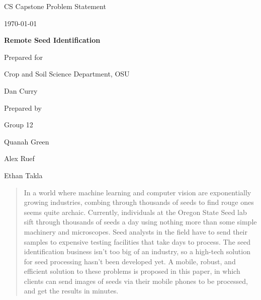 \documentclass[onecolumn, draftclsnofoot,10pt, compsoc]{IEEEtran}
\def \CapstoneTeamName{		The Cleverly Named Team}
\def \CapstoneTeamNumber{		12}
\def \GroupMemberOne{			Quanah Green}
\def \GroupMemberTwo{			Alex Ruef}
\def \GroupMemberThree{			Ethan Takla}
\def \CapstoneProjectName{		Remote Seed Identification}
\def \CapstoneSponsorCompany{	Crop and Soil Science Department, OSU}
\def \CapstoneSponsorPerson{		Dan Curry}
\def \DocType{		Problem Statement
				}
\newcommand{\NameSigPair}[1]{\par
\makebox[2.75in][r]{#1} \hfil 	\makebox[3.25in]{\makebox[2.25in]{\hrulefill} \hfill		\makebox[.75in]{\hrulefill}}
\par\vspace{-12pt} \textit{\tiny\noindent
\makebox[2.75in]{} \hfil		\makebox[3.25in]{\makebox[2.25in][r]{Signature} \hfill	\makebox[.75in][r]{Date}}}}
\renewcommand{\NameSigPair}[1]{#1}
\begin{document}
\begin{titlepage}
    \begin{singlespace}
        \hfill 
        \par\vspace{.2in}
        \centering
        \scshape{
            \huge CS Capstone \DocType \par
            {\large\today}\par
            \vspace{.5in}
            \textbf{\Huge\CapstoneProjectName}\par
            \vfill
            {\large Prepared for}\par
            \Huge \CapstoneSponsorCompany\par
            \vspace{5pt}
            {\Large\NameSigPair{\CapstoneSponsorPerson}\par}
            {\large Prepared by }\par
            Group\CapstoneTeamNumber\par
            \vspace{5pt}
            {\Large
                \NameSigPair{\GroupMemberOne}\par
                \NameSigPair{\GroupMemberTwo}\par
                \NameSigPair{\GroupMemberThree}\par
            }
            \vspace{20pt}
        }
        \begin{abstract}
	In a world where machine learning and computer vision are exponentially growing industries, combing through thousands of seeds to find rouge ones seems quite archaic. Currently, individuals at the Oregon State Seed lab sift through thousands of seeds a day using nothing more than some simple machinery and microscopes. Seed analysts in the field have to send their samples to expensive testing facilities that take days to process. The seed identification business isn't too big of an industry, so a high-tech solution for seed processing hasn't been developed yet. A mobile, robust, and efficient solution to these problems is proposed in this paper, in which clients can send images of seeds via their mobile phones to be processed, and get the results in minutes.


\end{abstract}
\end{singlespace}
\end{titlepage}
\end{document}
